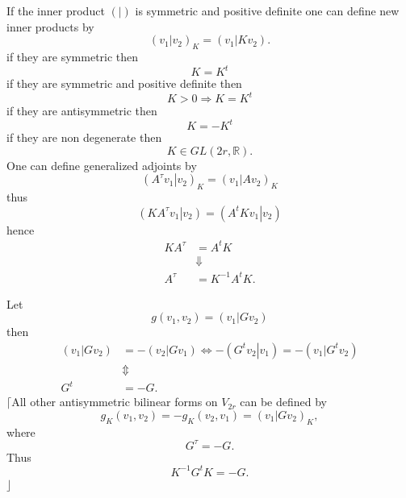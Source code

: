 \documentclass[aps,preprint]{revtex4}
\begin{document}
If the inner product $\left( \left. {}\right\vert \right) $ is symmetric and
positive definite one can define new inner products by 
\begin{equation}
\left( \left. v_{1}\right\vert v_{2}\right) _{K}=\left( \left.
v_{1}\right\vert Kv_{2}\right) .
\end{equation}%
if they are symmetric then 
\begin{equation}
K=K^{t}
\end{equation}%
if they are symmetric and positive definite then 
\begin{equation}
K>0\Rightarrow K=K^{t}
\end{equation}%
if they are antisymmetric then 
\begin{equation}
K=-K^{t}
\end{equation}%
if they are non degenerate then 
\begin{equation}
K\in GL\left( 2r,\mathbb{R}\right) .
\end{equation}%
One can define generalized adjoints by 
\begin{equation}
\left( \left. A^{\tau }v_{1}\right\vert v_{2}\right) _{K}=\left( \left.
v_{1}\right\vert Av_{2}\right) _{K}
\end{equation}%
thus 
\begin{equation}
\left( \left. KA^{\tau }v_{1}\right\vert v_{2}\right) =\left( \left.
A^{t}Kv_{1}\right\vert v_{2}\right)
\end{equation}%
hence 
\begin{align}
KA^{\tau }& =A^{t}K \\
& \Downarrow \\
A^{\tau }& =K^{-1}A^{t}K.
\end{align}

Let 
\begin{equation}
g\left( v_{1},v_{2}\right) =\left( \left. v_{1}\right\vert Gv_{2}\right)
\end{equation}%
then 
\begin{align}
\left( \left. v_{1}\right\vert Gv_{2}\right) & =-\left( \left.
v_{2}\right\vert Gv_{1}\right) \Longleftrightarrow -\left( \left.
G^{t}v_{2}\right\vert v_{1}\right) =-\left( \left. v_{1}\right\vert
G^{t}v_{2}\right) \\
& \Updownarrow \\
G^{t}& =-G.
\end{align}%
$\lceil $All other antisymmetric bilinear forms on $V_{2r}$ can be defined
by 
\begin{equation}
g_{K}\left( v_{1},v_{2}\right) =-g_{K}\left( v_{2},v_{1}\right) =\left(
\left. v_{1}\right\vert Gv_{2}\right) _{K},
\end{equation}%
where 
\begin{equation}
G^{\tau }=-G.
\end{equation}%
Thus 
\begin{equation}
K^{-1}G^{t}K=-G.
\end{equation}%
$\rfloor $
\end{document}
